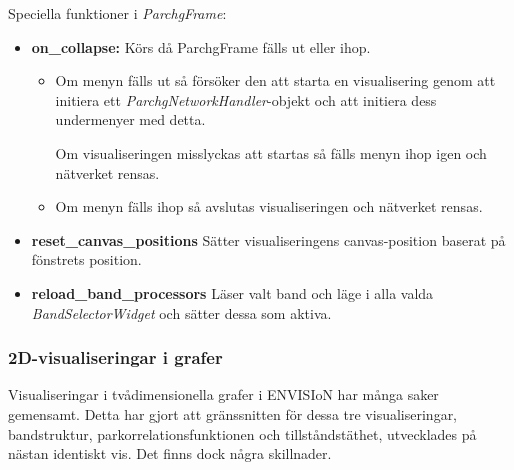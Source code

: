 
Speciella funktioner i \textit{ParchgFrame}:
\begin{itemize}
    \setlength\itemsep{0em}
    \item \textbf{on\_collapse: } Körs då ParchgFrame fälls ut eller ihop. 
    \begin{itemize}
        \setlength\itemsep{0em}
        \item Om menyn fälls ut så försöker den att starta en visualisering genom att initiera ett \textit{ParchgNetworkHandler}-objekt och att initiera dess undermenyer med detta. 
        
        Om visualiseringen misslyckas att startas så fälls menyn ihop igen och nätverket rensas.
        \item Om menyn fälls ihop så avslutas visualiseringen och nätverket rensas.
    \end{itemize}
    \item \textbf{reset\_canvas\_positions} Sätter visualiseringens canvas-position baserat på fönstrets position.
    \item \textbf{reload\_band\_processors} Läser valt band och läge i alla valda \textit{BandSelectorWidget} och sätter dessa som aktiva.
\end{itemize}

\subsubsection{2D-visualiseringar i grafer}
Visualiseringar i tvådimensionella grafer i ENVISIoN har många saker gemensamt. Detta har gjort att gränssnitten för dessa tre visualiseringar, bandstruktur, parkorrelationsfunktionen och tillståndstäthet, utvecklades på nästan identiskt vis. Det finns dock några skillnader.

